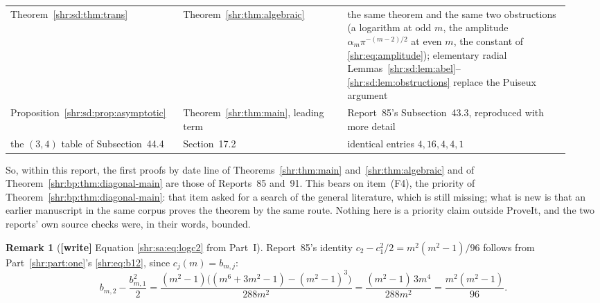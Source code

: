 \documentclass[11pt,letterpaper]{article}
\numberwithin{equation}{section}
\theoremstyle{definition}
\newtheorem{remark}[theorem]{Remark}
\newcommand{\1}{\mathbf 1}
\begin{document}
{\begin{longtable}{@{}>{\raggedright\arraybackslash}p{0.27\linewidth}>{\raggedright\arraybackslash}p{0.29\linewidth}>{\raggedright\arraybackslash}p{0.38\linewidth}@{}}
Theorem~\ref{shr:sd:thm:trans} & Theorem~\ref{shr:thm:algebraic} & the same theorem and the same two obstructions (a logarithm at odd $m$, the amplitude $\alpha_m\pi^{-(m-2)/2}$ at even $m$, the constant of \eqref{shr:eq:amplitude}); elementary radial Lemmas~\ref{shr:sd:lem:abel}--\ref{shr:sd:lem:obstructions} replace the Puiseux argument\\
Proposition~\ref{shr:sd:prop:asymptotic} & Theorem~\ref{shr:thm:main}, leading term & Report~85's Subsection~43.3, reproduced with more detail\\
the $(3,4)$ table of Subsection~44.4 & Section~17.2 & identical entries $4,16,4,4,1$\\
\bottomrule
\end{longtable}}

So, within this report, the first proofs by date line of
Theorems~\ref{shr:thm:main} and~\ref{shr:thm:algebraic} and of
Theorem~\ref{shr:bp:thm:diagonal-main} are those of Reports~85 and~91.
This bears on item~(F4), the priority of
Theorem~\ref{shr:bp:thm:diagonal-main}: that item asked for a search of the
general literature, which is still missing; what is new is that an earlier
manuscript in the same corpus proves the theorem by the same route.
Nothing here is a priority claim outside ProveIt, and the two reports'
own source checks were, in their words, bounded.

\begin{remark}[\textbf{[write]} Equation \eqref{shr:sa:eq:logc2} from Part~I]
\label{shr:sa:rem:logc2}
Report~85's identity $c_2-c_1^2/2=m^2(m^2-1)/96$ follows from
Part~\ref{shr:part:one}'s \eqref{shr:eq:b12}, since $c_j(m)=b_{m,j}$:
\[
 b_{m,2}-\frac{b_{m,1}^2}2
 =\frac{(m^2-1)\bigl((m^6+3m^2-1)-(m^2-1)^3\bigr)}{288m^2}
 =\frac{(m^2-1)\,3m^4}{288m^2}
 =\frac{m^2(m^2-1)}{96}.
\]
\end{remark}
\end{document}
